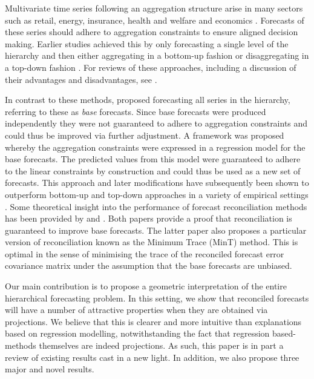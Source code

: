 \documentclass[12pt]{article}
\theoremstyle{definition}
\begin{document}
Multivariate time series following an aggregation structure arise in many sectors such as retail, energy, insurance, health and welfare and economics \citep[see for example][]{KarMal2019, Taieb2017, NysEtAl2019, AlmVan2016, JeoEtAl2019, Mahkya2017, LiTan2019, Shang2017, AthEtAl2019_MacroBook}. Forecasts of these series should adhere to aggregation constraints to ensure aligned decision making. Earlier studies achieved this by only forecasting a single level of the hierarchy and then either aggregating in a bottom-up fashion \citep{Dunn1976} or disaggregating in a top-down fashion \citep{Gross1990, Athanasopoulos2009}. For reviews of these approaches, including a discussion of their advantages and disadvantages, see \citet{Schwarzkopf1988, Kahn1998, Lapide1998, Fliedner2001}.

In contrast to these methods, \citet{Hyndman2011} proposed forecasting all series in the hierarchy, referring to these as \emph{base} forecasts. Since base forecasts were produced independently they were not guaranteed to adhere to aggregation constraints and could thus be improved via further adjustment. A framework was proposed whereby the aggregation constraints were expressed in a regression model for the base forecasts. The predicted values from this model were guaranteed to adhere to the linear constraints by construction and could thus be used as a new set of forecasts. This approach and later modifications have subsequently been shown to outperform bottom-up and top-down approaches in a variety of empirical settings \citep[see for example][among others]{Athanasopoulos2009, AthEtAl2017, WicEtAl2019}.  Some theoretical insight into the performance of forecast reconciliation methods has been provided by \citet{VanErven2015a} and \citet{WicEtAl2019}. Both papers provide a proof that reconciliation is guaranteed to improve base forecasts. The latter paper also proposes a particular version of reconciliation known as the Minimum Trace (MinT) method. This is optimal in the sense of minimising the trace of the reconciled forecast error covariance matrix under the assumption that the base forecasts are unbiased.

Our main contribution is to propose a geometric interpretation of the entire hierarchical forecasting problem. In this setting, we show that reconciled forecasts will have a number of attractive properties when they are obtained via projections. We believe that this is clearer and more intuitive than explanations based on regression modelling, notwithstanding the fact that regression based-methods themselves are indeed projections. As such, this paper is in part a review of existing results cast in a new light. In addition, we also propose three major and novel results.
\end{document}
